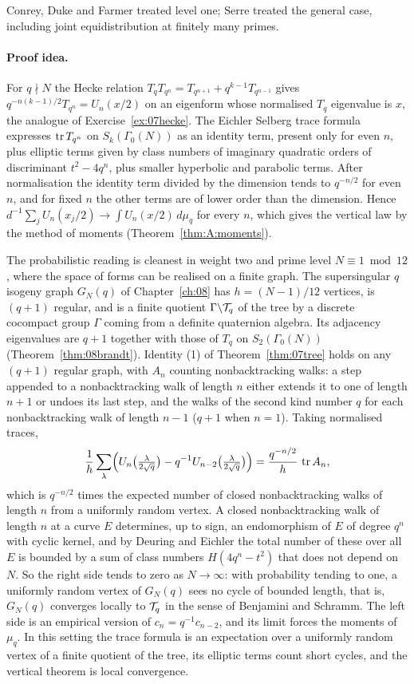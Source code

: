 Conrey, Duke and Farmer treated level one; Serre treated the general case, including joint equidistribution at finitely many primes.

\paragraph{Proof idea.} For $q\nmid N$ the Hecke relation $T_qT_{q^n}=T_{q^{n+1}}+q^{k-1}T_{q^{n-1}}$ gives $q^{-n(k-1)/2}T_{q^n}=U_n(x/2)$ on an eigenform whose normalised $T_q$ eigenvalue is $x$, the analogue of Exercise~\ref{ex:07hecke}. The Eichler Selberg trace formula expresses $\operatorname{tr} T_{q^n}$ on $S_k(\Gamma_0(N))$ as an identity term, present only for even $n$, plus elliptic terms given by class numbers of imaginary quadratic orders of discriminant $t^2-4q^n$, plus smaller hyperbolic and parabolic terms. After normalisation the identity term divided by the dimension tends to $q^{-n/2}$ for even $n$, and for fixed $n$ the other terms are of lower order than the dimension. Hence $d^{-1}\sum_jU_n(x_j/2)\to\int U_n(x/2)\,d\mu_q$ for every $n$, which gives the vertical law by the method of moments (Theorem~\ref{thm:A:moments}).

The probabilistic reading is cleanest in weight two and prime level $N\equiv1\bmod12$, where the space of forms can be realised on a finite graph. The supersingular $q$ isogeny graph $G_N(q)$ of Chapter~\ref{ch:08} has $h=(N-1)/12$ vertices, is $(q+1)$ regular, and is a finite quotient $\Gamma\backslash\mathcal{T}_q$ of the tree by a discrete cocompact group $\Gamma$ coming from a definite quaternion algebra. Its adjacency eigenvalues are $q+1$ together with those of $T_q$ on $S_2(\Gamma_0(N))$ (Theorem~\ref{thm:08brandt}). Identity (1) of Theorem~\ref{thm:07tree} holds on any $(q+1)$ regular graph, with $A_n$ counting nonbacktracking walks: a step appended to a nonbacktracking walk of length $n$ either extends it to one of length $n+1$ or undoes its last step, and the walks of the second kind number $q$ for each nonbacktracking walk of length $n-1$ ($q+1$ when $n=1$). Taking normalised traces,
\[
\frac1h\sum_{\lambda}\Bigl(U_n\bigl(\tfrac{\lambda}{2\sqrt q}\bigr)-q^{-1}U_{n-2}\bigl(\tfrac{\lambda}{2\sqrt q}\bigr)\Bigr)=\frac{q^{-n/2}}{h}\,\operatorname{tr} A_n ,
\]
which is $q^{-n/2}$ times the expected number of closed nonbacktracking walks of length $n$ from a uniformly random vertex. A closed nonbacktracking walk of length $n$ at a curve $E$ determines, up to sign, an endomorphism of $E$ of degree $q^n$ with cyclic kernel, and by Deuring and Eichler \cite{deuring1941,eichler1954,gross1987} the total number of these over all $E$ is bounded by a sum of class numbers $H(4q^n-t^2)$ that does not depend on $N$. So the right side tends to zero as $N\to\infty$: with probability tending to one, a uniformly random vertex of $G_N(q)$ sees no cycle of bounded length, that is, $G_N(q)$ converges locally to $\mathcal{T}_q$ in the sense of Benjamini and Schramm. The left side is an empirical version of $c_n=q^{-1}c_{n-2}$, and its limit forces the moments of $\mu_q$. In this setting the trace formula is an expectation over a uniformly random vertex of a finite quotient of the tree, its elliptic terms count short cycles, and the vertical theorem is local convergence.

